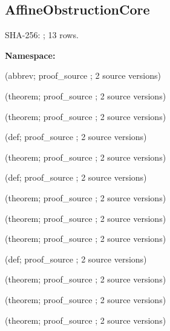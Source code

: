 \subsection*{AffineObstructionCore}
{\footnotesize SHA-256: ; 13 rows.}\par
\begingroup\small
\textbf{Namespace:} \par
\noindent{} {\scriptsize (abbrev; proof\_source ; 2 source versions)}\par
\noindent{} {\scriptsize (theorem; proof\_source ; 2 source versions)}\par
\noindent{} {\scriptsize (theorem; proof\_source ; 2 source versions)}\par
\noindent{} {\scriptsize (def; proof\_source ; 2 source versions)}\par
\noindent{} {\scriptsize (theorem; proof\_source ; 2 source versions)}\par
\noindent{} {\scriptsize (def; proof\_source ; 2 source versions)}\par
\noindent{} {\scriptsize (theorem; proof\_source ; 2 source versions)}\par
\noindent{} {\scriptsize (theorem; proof\_source ; 2 source versions)}\par
\noindent{} {\scriptsize (theorem; proof\_source ; 2 source versions)}\par
\noindent{} {\scriptsize (def; proof\_source ; 2 source versions)}\par
\noindent{} {\scriptsize (theorem; proof\_source ; 2 source versions)}\par
\noindent{} {\scriptsize (theorem; proof\_source ; 2 source versions)}\par
\noindent{} {\scriptsize (theorem; proof\_source ; 2 source versions)}\par
\endgroup
